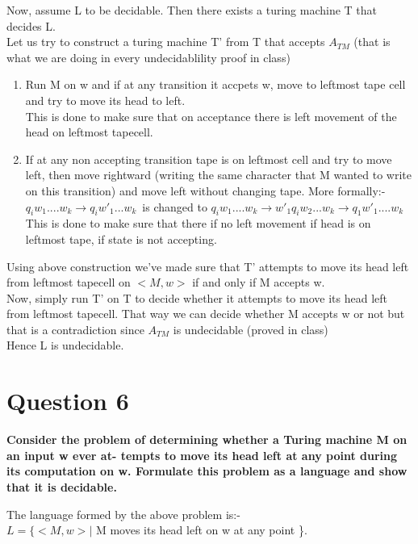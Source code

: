 \documentclass{article}
\begin{document}
Now, assume L to be decidable. Then there exists a turing machine T that decides L.\\
Let us try to construct a turing machine T' from T that accepts $A_{TM}$ (that is what we are doing in every undecidablility proof in class)
\begin{enumerate}
    \item Run M on w and if at any transition it accpets w, move to leftmost tape cell and try to move its head to left.\\
        This is done to make sure that on acceptance there is left movement of the head on leftmost tapecell.\\
    \item If at any non accepting transition tape is on leftmost cell and try to move left, then move rightward (writing the same character that M wanted to write on this transition) and move 
            left without changing tape. More formally:- \\
            $q_iw_1....w_k \rightarrow q_iw'_1...w_k $\ is changed to $q_iw_1....w_k \rightarrow w'_1q_iw_2...w_k \rightarrow q_1w'_1....w_k$\\
            This is done to make sure that there if no left movement if head is on leftmost tape, if state is not accepting.
\end{enumerate} 

Using above construction we've made sure that T' attempts to move its head left from leftmost tapecell on $<M,w>$ if and only if M accepts w.\\
Now, simply run T' on T to decide whether it attempts to move its head left from leftmost tapecell. That way we can decide whether M accepts w or not but that is 
a contradiction since $A_{TM}$ is undecidable (proved in class)\\
Hence L is undecidable.

\pagebreak


\section{Question 6}

\textbf{Consider the problem of determining whether a Turing machine M on an input w ever at-
tempts to move its head left at any point during its computation on w. Formulate this
problem as a language and show that it is decidable.\\}

The language formed by the above problem is:- \\
$L = \{ <M,w> |$ M moves its head left on w at any point \}.\\
\end{document}
